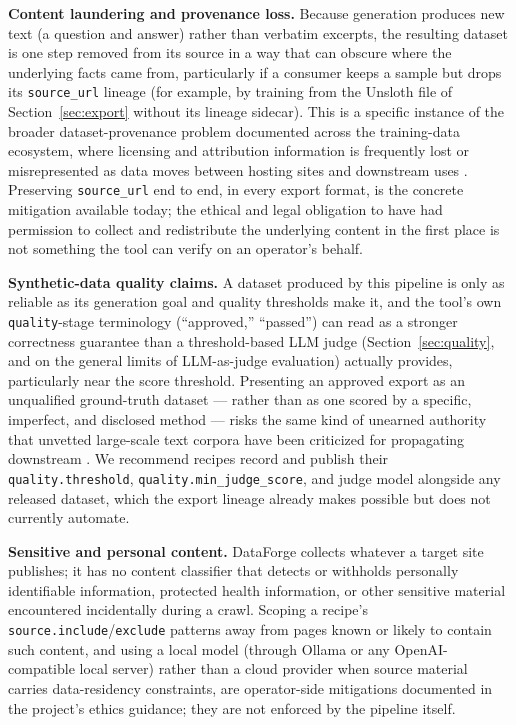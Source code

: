 \documentclass[11pt]{article}
\begin{document}
\textbf{Content laundering and provenance loss.} Because generation
produces new text (a question and answer) rather than verbatim excerpts,
the resulting dataset is one step removed from its source in a way that
can obscure where the underlying facts came from, particularly if a
consumer keeps a sample but drops its \texttt{source\_url} lineage (for
example, by training from the Unsloth file of Section~\ref{sec:export}
without its lineage sidecar). This is a specific
instance of the broader dataset-provenance problem documented across the
training-data ecosystem, where licensing and attribution information is
frequently lost or misrepresented as data moves between hosting sites and
downstream uses \cite{longpre2023provenance}. Preserving
\texttt{source\_url} end to end, in every export format, is the concrete
mitigation available today; the ethical and legal obligation to have had permission
to collect and redistribute the underlying content in the first place is
not something the tool can verify on an operator's behalf.

\textbf{Synthetic-data quality claims.} A dataset produced by this
pipeline is only as reliable as its generation goal and quality
thresholds make it, and the tool's own \texttt{quality}-stage terminology
(``approved,'' ``passed'') can read as a stronger correctness guarantee
than a threshold-based LLM judge (Section~\ref{sec:quality}, and
\cite{zheng2023judging} on the general limits of LLM-as-judge evaluation)
actually provides, particularly near the score threshold. Presenting an
approved export as an unqualified ground-truth dataset --- rather than as
one scored by a specific, imperfect, and disclosed method --- risks the
same kind of unearned authority that unvetted large-scale text corpora
have been criticized for propagating downstream
\cite{bender2021parrots}. We recommend recipes record and publish their
\texttt{quality.threshold}, \texttt{quality.min\_judge\_score}, and judge
model alongside any released dataset, which the export lineage already
makes possible but does not currently automate.

\textbf{Sensitive and personal content.} DataForge collects whatever a
target site publishes; it has no content classifier that detects or
withholds personally identifiable information, protected health
information, or other sensitive material encountered incidentally during
a crawl. Scoping a recipe's \texttt{source.include}/\texttt{exclude}
patterns away from pages known or likely to contain such content, and
using a local model (through Ollama or any OpenAI-compatible local
server) rather than a cloud provider when source
material carries data-residency constraints, are operator-side
mitigations documented in the project's ethics guidance; they are not
enforced by the pipeline itself.
\end{document}
